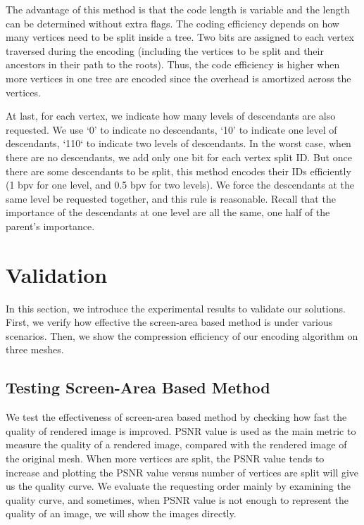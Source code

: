     The advantage of this method is that the code length is variable and the 
    length can be determined without extra flags. The coding efficiency depends
    on how many vertices need to be split inside a tree. Two bits
    are assigned to each vertex traversed during the encoding
    (including the vertices to be split and their ancestors in their path
    to the roots). Thus, the code efficiency is higher when more vertices in one tree
    are encoded since the overhead is amortized across the vertices. 

    At last, for each vertex, we indicate how many levels of descendants are also requested.
    We use `0' to indicate no descendants, `10' to indicate one level of descendants,
    `110` to indicate two levels of descendants. 
    In the worst case, when there are no descendants, we add only one bit for each vertex split
    ID. But once there are some descendants to be split, this method encodes their IDs 
    efficiently (1 bpv for one level, and 0.5 bpv for two levels). 
    We force the descendants at the same level be requested together, and 
    this rule is reasonable. Recall that the importance of the descendants at one level are all the same, 
    one half of the parent's importance.
\section{Validation}
In this section, we introduce the experimental results to 
validate our solutions. First, we verify 
how effective the screen-area based method is under 
various scenarios.
Then, we show the compression efficiency of 
our encoding algorithm on three meshes.
\label{s:dstream:evaluation}

\subsection{Testing Screen-Area Based Method}
We test the effectiveness of screen-area based method by checking
how fast the quality of rendered image is improved. PSNR value 
is used as the main metric to measure the quality of a rendered
image, compared with the rendered image of the original mesh. 
When more vertices are split, the PSNR value tends to increase
and plotting the PSNR value versus number of vertices are split
will give us the quality curve. 
We evaluate the requesting order mainly by examining the quality
curve, and sometimes, when PSNR value is not enough to 
represent the quality of an image, we will show the images directly.

